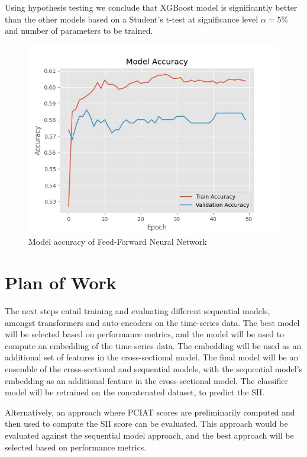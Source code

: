 \documentclass[11pt]{extarticle}
\newcommand{\todo}{\textcolor{red}{TODO:}~}
\begin{document}
Using hypothesis testing we conclude that XGBoost model is significantly better than the other models based on a Student's t-test at significance level $\alpha=5\%$ and number of parameters to be trained.

\begin{figure}[h!]
    \centering
    \includegraphics[scale=0.8]{"./images/model_accuracy.jpg"}
    \caption{Model accuracy of Feed-Forward Neural Network}
\end{figure}

\section{Plan of Work} 

The next steps entail training and evaluating different sequential models, amongst transformers and auto-encoders on the time-series data. 
The best model will be selected based on performance metrics, and the model will be used to compute an embedding of the time-series data. 
The embedding will be used as an additional set of features in the cross-sectional model. 
The final model will be an ensemble of the cross-sectional and sequential models, with the sequential model's embedding as an additional feature in the cross-sectional model. 
The classifier model will be retrained on the concatenated dataset, to predict the SII.

Alternatively, an approach where PCIAT scores are preliminarily computed and then used to compute the SII score can be evaluated. 
This approach would be evaluated against the sequential model approach, and the best approach will be selected based on performance metrics.
\end{document}
